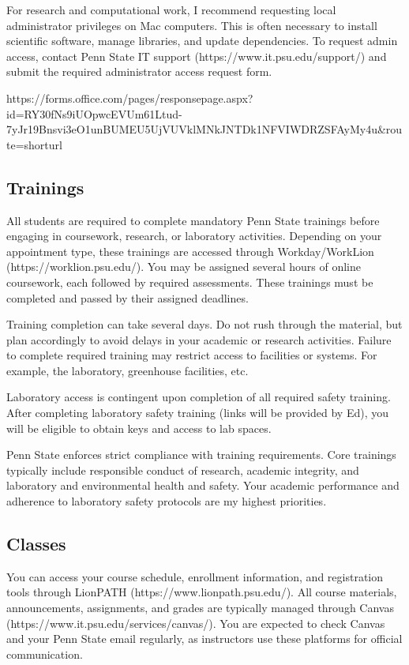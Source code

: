 \documentclass[11pt, oneside]{article}   	%
\begin{document}
For research and computational work, I recommend requesting local administrator privileges on Mac computers. This is often necessary to install scientific software, manage libraries, and update dependencies. To request admin access, contact Penn State IT support (https://www.it.psu.edu/support/) and submit the required administrator access request form.

\newline

https://forms.office.com/pages/responsepage.aspx?id=RY30fNs9iUOpwcEVUm61Ltud-7yJr19Bnsvi3eO1unBUMEU5UjVUVklMNkJNTDk1NFVIWDRZSFAyMy4u&route=shorturl

\subsection{Trainings}
All students are required to complete mandatory Penn State trainings before engaging in coursework, research, or laboratory activities. Depending on your appointment type, these trainings are accessed through Workday/WorkLion (https://worklion.psu.edu/). You may be assigned several hours of online coursework, each followed by required assessments. These trainings must be completed and passed by their assigned deadlines.

Training completion can take several days. Do not rush through the material, but plan accordingly to avoid delays in your academic or research activities. Failure to complete required training may restrict access to facilities or systems. For example, the laboratory, greenhouse facilities, etc.

Laboratory access is contingent upon completion of all required safety training. After completing laboratory safety training (links will be provided by Ed), you will be eligible to obtain keys and access to lab spaces.

Penn State enforces strict compliance with training requirements. Core trainings typically include responsible conduct of research, academic integrity, and laboratory and environmental health and safety. Your academic performance and adherence to laboratory safety protocols are my highest priorities.


\subsection{Classes}
You can access your course schedule, enrollment information, and registration tools through LionPATH (https://www.lionpath.psu.edu/). All course materials, announcements, assignments, and grades are typically managed through Canvas (https://www.it.psu.edu/services/canvas/). You are expected to check Canvas and your Penn State email regularly, as instructors use these platforms for official communication.
\end{document}
